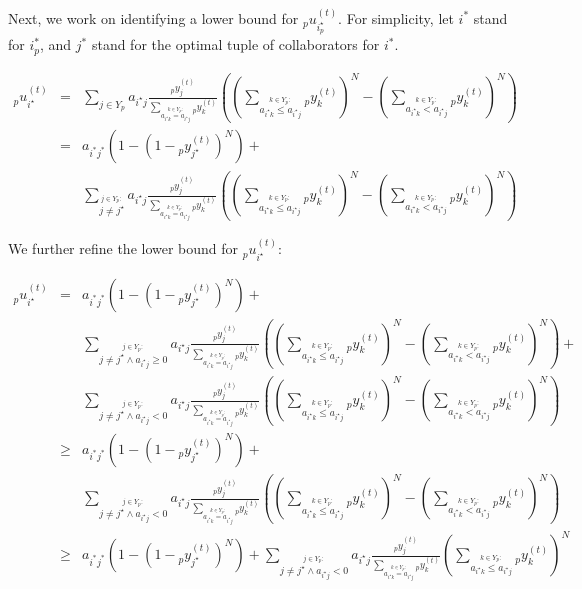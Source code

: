 \documentclass{sig-alt-full}
\newcommand\suma[1]{\displaystyle\sum_{#1}}
\newcommand\sumb[2]{\displaystyle\sum_{\stackrel{{#1} :}{#2}}}
\begin{document}
Next, we work on identifying a lower bound for ${_p}u^{(t)}_{i_p^\star}$.  For simplicity, let $i^*$ stand for $i_p^*$, and $j^*$ stand for the optimal tuple of collaborators for $i^*$.

\noindent\begin{eqnarray*}
{_p}u^{(t)}_{i^\star} & = & \suma{j \in Y_{p}} { a_{i^\star j} \frac{{_p}y^{(t)}_j}{ \sumb{k \in Y_{p}}{a_{i^\star k} = a_{i^\star j}} {_p}y^{(t)}_k } \left( \left( \sumb{k \in Y_{p}}{a_{i^\star k} \leq a_{i^\star j} } {_p}y^{(t)}_k \right)^N - \left( \sumb{k \in Y_{p}}{a_{i^\star k} < a_{i^\star j} } {_p}y^{(t)}_k \right)^N \right) }\\
& = & a_{i^* j^*} \left( 1 - \left( 1 - {_p}y^{(t)}_{j^\star} \right) ^N \right) +\\
& & \sumb{j \in Y_{p}}{j \neq j^\star} { a_{i^\star j} \frac{{_p}y^{(t)}_j}{ \sumb{k \in Y_{p}}{a_{i^\star k} = a_{i^\star j} } {_p}y^{(t)}_k} \left( \left( \sumb{k \in Y_{p}}{a_{i^\star k} \leq a_{i^\star j} } {_p}y^{(t)}_k \right)^N - \left( \sumb{k \in Y_{p}}{a_{i^\star k} < a_{i^\star j} } {_p}y^{(t)}_k \right)^N \right) }
\end{eqnarray*}

\vspace{10in}
\noindent We further refine the lower bound for ${_p}u^{(t)}_{i^\star}$:


\noindent\begin{eqnarray*}
{_p}u^{(t)}_{i^\star} & = & a_{i^* j^*} \left( 1 - \left( 1 - {_p}y^{(t)}_{j^\star} \right) ^N \right) +\\
& & \sumb{j \in Y_{p}}{j \neq j^\star \wedge a_{i^\star j} \geq 0} { a_{i^\star j} \frac{{_p}y^{(t)}_j}{ \sumb{k \in Y_{p}}{a_{i^\star k} = a_{i^\star j} } {_p}y^{(t)}_k} \left( \left( \sumb{k \in Y_{p}}{a_{i^\star k} \leq a_{i^\star j} } {_p}y^{(t)}_k \right)^N - \left( \sumb{k \in Y_{p}}{a_{i^\star k} < a_{i^\star j} } {_p}y^{(t)}_k \right)^N \right) }+\\
& & \sumb{j \in Y_{p}}{j \neq j^\star \wedge a_{i^\star j} < 0} { a_{i^\star j} \frac{{_p}y^{(t)}_j}{ \sumb{k \in Y_{p}}{a_{i^\star k} = a_{i^\star j} } {_p}y^{(t)}_k} \left( \left( \sumb{k \in Y_{p}}{a_{i^\star k} \leq a_{i^\star j} } {_p}y^{(t)}_k \right)^N - \left( \sumb{k \in Y_{p}}{a_{i^\star k} < a_{i^\star j} } {_p}y^{(t)}_k \right)^N \right) }\\
& \geq & a_{i^* j^*} \left( 1 - \left( 1 - {_p}y^{(t)}_{j^\star} \right) ^N \right) +\\
& & \sumb{j \in Y_{p}}{j \neq j^\star \wedge a_{i^\star j} < 0} { a_{i^\star j} \frac{ {_p}y^{(t)}_j}{ \sumb{k \in Y_{p}}{a_{i^\star k} = a_{i^\star j} } {_p}y^{(t)}_k} \left( \left( \sumb{k \in Y_{p}}{a_{i^\star k} \leq a_{i^\star j} } {_p}y^{(t)}_k \right)^N - \left( \sumb{k \in Y_{p}}{a_{i^\star k} < a_{i^\star j} } {_p}y^{(t)}_k \right)^N \right) }\\
& \geq & a_{i^* j^*} \left( 1 - \left( 1 - {_p}y^{(t)}_{j^\star} \right) ^N \right) + \sumb{j \in Y_{p}}{j \neq j^\star \wedge a_{i^\star j} < 0} { a_{i^\star j} \frac{ {_p}y^{(t)}_j}{ \sumb{k \in Y_{p}}{a_{i^\star k} = a_{i^\star j} } {_p}y^{(t)}_k} \left( \sumb{k \in Y_{p}}{a_{i^\star k} \leq a_{i^\star j} } {_p}y^{(t)}_k \right)^N }
\end{eqnarray*}
\end{document}
